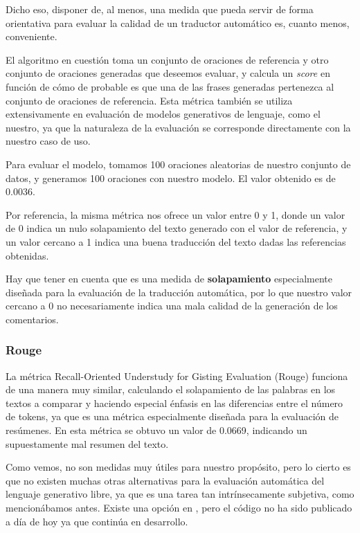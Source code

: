 Dicho eso, disponer de, al menos, una medida que pueda servir de forma orientativa para evaluar la calidad de un traductor automático es, cuanto menos, conveniente.

El algoritmo en cuestión toma un conjunto de oraciones de referencia y otro conjunto de oraciones generadas que deseemos evaluar, y calcula un \textit{score} en función de cómo de probable es que una de las frases generadas pertenezca al conjunto de oraciones de referencia. Esta métrica también se utiliza extensivamente en evaluación de modelos generativos de lenguaje, como el nuestro, ya que la naturaleza de la evaluación se corresponde directamente con la nuestro caso de uso.


Para evaluar el modelo, tomamos 100 oraciones aleatorias de nuestro conjunto de datos, y generamos 100 oraciones con nuestro modelo. El valor obtenido es de 0.0036. 

Por referencia, la misma métrica nos ofrece un valor entre 0 y 1, donde un valor de 0 indica un nulo solapamiento del texto generado con el valor de referencia, y un valor cercano a 1 indica una buena traducción del texto dadas las referencias obtenidas.

Hay que tener en cuenta que es una medida de \textbf{solapamiento} especialmente diseñada para la evaluación de la traducción automática, por lo que nuestro valor cercano a 0 no necesariamente indica una mala calidad de la generación de los comentarios.

\subsubsection{Rouge}
La métrica Recall-Oriented Understudy for Gisting Evaluation (Rouge) funciona de una manera muy similar, calculando el solapamiento de las palabras en los textos a comparar y haciendo especial énfasis en las diferencias entre el número de tokens, ya que es una métrica especialmente diseñada para la evaluación de resúmenes. En esta métrica se obtuvo un valor de 0.0669, indicando un supuestamente mal resumen del texto. 

Como vemos, no son medidas muy útiles para nuestro propósito, pero lo cierto es que no existen muchas otras alternativas para la evaluación automática del lenguaje generativo libre, ya que es una tarea tan intrínsecamente subjetiva, como mencionábamos antes. Existe una opción en \cite{yuan2021bartscore}, pero el código no ha sido publicado a día de hoy ya que continúa en desarrollo. 

